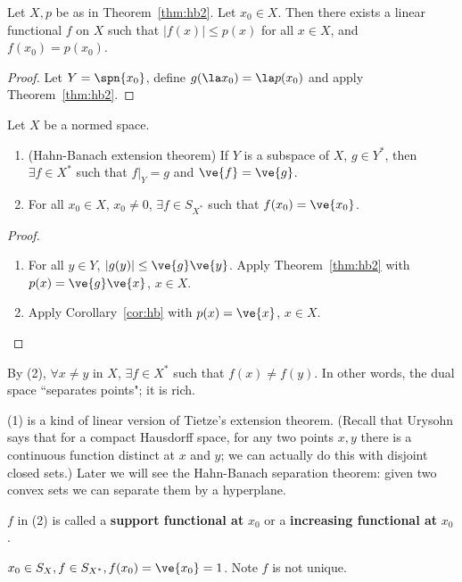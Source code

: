 \begin{cor}
Let $X,p$ be as in Theorem~\ref{thm:hb2}. Let $x_0\in X$. Then there exists a linear functional $f$ on $X$ such that $|f(x)|\le p(x)$ for all $x\in X$, and $f(x_0)=p(x_0)$.
\end{cor}
\begin{proof}
Let $Y=\spn \{x_0\}$, define $g(\la x_0)=\la p(x_0)$ and apply Theorem~\ref{thm:hb2}.
\end{proof}
\begin{thm}
Let $X$ be a normed space.
\begin{enumerate}
\item
(Hahn-Banach extension theorem) If $Y$ is a subspace of $X$, $g\in Y^*$, then $\exists f\in X^*$ such that $f|_Y=g$ and $\ve{f}=\ve{g}$.
\item
For all $x_0\in X$, $x_0\ne 0$, $\exists f\in S_{X^*}$ such that $f(x_0)=\ve{x_0}$.
\end{enumerate}
\end{thm}
\begin{proof}
\begin{enumerate}
\item
For all $y\in Y$, $|g(y)|\le \ve{g}\ve{y}$. Apply Theorem~\ref{thm:hb2} with $p(x)=\ve{g}\ve{x}$, $x\in X$.
\item
Apply Corollary~\ref{cor:hb} with $p(x)=\ve{x}$, $x\in X$.
\end{enumerate}
\end{proof}
\begin{rem}
\item
By (2), $\forall x\ne y$ in $X$, $\exists f\in X^*$ such that $f(x)\ne f(y)$. In other words, the dual space ``separates points"; it is rich.
\item
(1) is a kind of linear version of Tietze's extension theorem. (Recall that Urysohn says that for a compact Hausdorff space, for any two points $x,y$ there is a continuous function distinct at $x$ and $y$; we can actually do this with disjoint closed sets.) Later we will see the Hahn-Banach separation theorem: given two convex sets we can separate them by a hyperplane.
\item
$f$ in (2) is called a \textbf{support functional at} $x_0$ or a \textbf{increasing functional at} $x_0$.
\end{rem}

$x_0\in S_X,f\in S_{X^*}, f(x_0)=\ve{x_0}=1$. Note $f$ is not unique.

